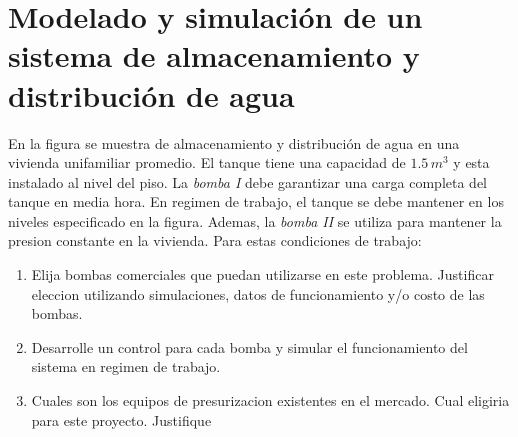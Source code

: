 \section{Modelado y simulación de un sistema de almacenamiento y distribución de agua}
En la figura se muestra de almacenamiento y distribución de agua en una vivienda unifamiliar promedio. El tanque tiene una capacidad de $1.5\,m^{3}$ y esta instalado
al nivel del piso. La \textit{bomba I} debe garantizar una carga completa del tanque en media hora. En regimen de trabajo, el tanque se debe mantener en los niveles
especificado en la figura. Ademas, la \textit{bomba II} se utiliza para mantener la presion constante en la vivienda. Para estas condiciones de trabajo:
\begin{enumerate}
   \item Elija bombas comerciales que puedan utilizarse en este problema. Justificar eleccion utilizando simulaciones, datos de funcionamiento y/o costo de las bombas.
   \item Desarrolle un control para cada bomba y simular el funcionamiento del sistema en regimen de trabajo.
   \item Cuales son los equipos de presurizacion existentes en el mercado. Cual eligiria para este proyecto. Justifique
\end{enumerate}

